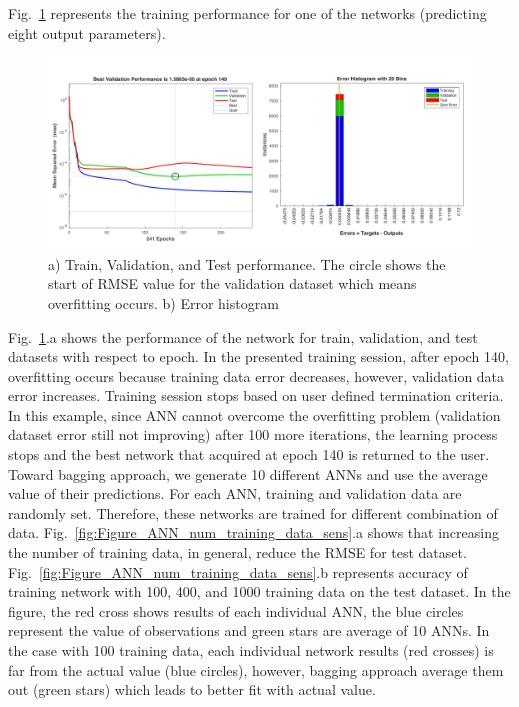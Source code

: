  Fig.~\ref{fig:Figure_training_performance} represents the training performance for one of the networks (predicting eight output parameters).


  \begin{figure}[ht]
    \centering
    \includegraphics[width=\textwidth]{figures/pdf/Figure_11.pdf}
    \caption{a) Train, Validation, and Test performance. The circle shows the start of RMSE value for the validation dataset which means overfitting occurs. b) Error histogram}
    \label{fig:Figure_training_performance}
\end{figure}

Fig.~\ref{fig:Figure_training_performance}.a shows the performance of the network for train, validation, and test datasets with respect to epoch.  In the presented training session, after epoch 140, overfitting occurs because training data error decreases, however, validation data error increases. Training session stops based on user defined termination criteria. In this example, since ANN cannot overcome the overfitting problem (validation dataset error still not improving) after 100 more iterations, the learning process stops and the best network that acquired at epoch 140 is returned to the user. Toward bagging approach, we generate 10 different ANNs and use the average value of their predictions. For each ANN, training and validation data are randomly set. Therefore, these networks are trained for different combination of data. Fig.~\ref{fig:Figure_ANN_num_training_data_sens}.a shows that increasing the number of training data, in general, reduce the RMSE for test dataset. Fig.~\ref{fig:Figure_ANN_num_training_data_sens}.b represents accuracy of training network with 100, 400, and 1000 training data on the test dataset. In the figure, the red cross shows results of each individual ANN, the blue circles represent the value of observations and green stars are average of 10 ANNs. In the case with 100 training data, each individual network results (red crosses) is far from the actual value (blue circles), however, bagging approach average them out (green stars) which leads to better fit with actual value. 

